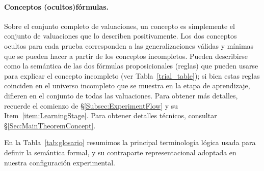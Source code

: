 \paragraph{Conceptos (ocultos)\textemdash fórmulas.}
Sobre el conjunto completo de valuaciones, un concepto es simplemente el conjunto de valuaciones que lo describen positivamente. Los dos conceptos ocultos para cada prueba corresponden a las generalizaciones válidas y mínimas que se pueden hacer a partir de los conceptos incompletos. Pueden describirse como la semántica de las dos fórmulas proposicionales (reglas) que pueden usarse para explicar el concepto incompleto (ver Tabla~\ref{trial_table}); si bien estas reglas coinciden en el universo incompleto que se muestra en la etapa de aprendizaje, difieren en el conjunto de todas las valuaciones. Para obtener más detalles, recuerde el comienzo de \S\ref{Subsec:ExperimentFlow} y su Item~\ref{item:LearningStage}. Para obtener detalles técnicos, consultar \S\ref{Sec:MainTheoremConcept}.

\bigskip

En la Tabla~\ref{tab:glosario} resumimos la principal terminología lógica usada para definir la semántica formal, y su contraparte representacional adoptada en nuestra configuración experimental.

